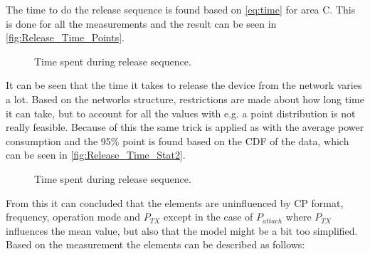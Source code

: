 The time to do the release sequence is found based on \autoref{eq:time} for area C. This is done for all the measurements and the result can be seen in \autoref{fig:Release_Time_Points}. 

\begin{figure}[H]
\centering
\begin{minipage}{0.48\textwidth}
\resizebox{\textwidth}{!}{
}
\end{minipage}
\hfill
\begin{minipage}{0.48\textwidth}
\resizebox{\textwidth}{!}{
}
\end{minipage}
\caption{Time spent during release sequence.}
\label{fig:Release_Time_Points}
\end{figure}

It can be seen that the time it takes to release the device from the network varies a lot. Based on the networks structure, restrictions are made about how long time it can take, but to account for all the values with e.g. a point distribution is not really feasible. Because of this the same trick is applied as with the average power consumption and the 95\% point is found based on the CDF of the data, which can be seen in \autoref{fig:Release_Time_Stat2}.

\begin{figure}[H]
\centering
\begin{minipage}{0.48\textwidth}
\resizebox{\textwidth}{!}{
}
\end{minipage}
\caption{Time spent during release sequence.}
\label{fig:Release_Time_Stat2}
\end{figure}

From this it can concluded that the elements are uninfluenced by CP format, frequency, operation mode and $P_{TX}$ except in the case of $P_{attach}$ where $P_{TX}$ influences the mean value, but also that the model might be a bit too simplified. Based on the measurement the elements can be described as follows:

